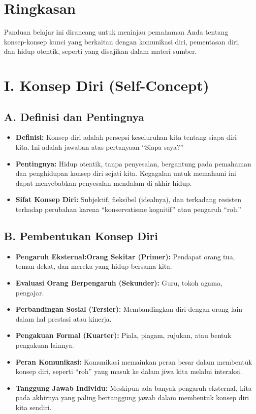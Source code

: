 \documentclass[
  letterpaper,
  DIV=11,
  numbers=noendperiod]{scrreprt}
\providecommand{\tightlist}{%
  \setlength{\itemsep}{0pt}\setlength{\parskip}{0pt}}
\begin{document}
\section{\texorpdfstring{\textbf{Ringkasan}}{Ringkasan}}\label{ringkasan}

Panduan belajar ini dirancang untuk meninjau pemahaman Anda tentang
konsep-konsep kunci yang berkaitan dengan komunikasi diri, pementasan
diri, dan hidup otentik, seperti yang disajikan dalam materi sumber.

\section{I. Konsep Diri
(Self-Concept)}\label{i.-konsep-diri-self-concept}

\subsection{A. Definisi dan
Pentingnya}\label{a.-definisi-dan-pentingnya}

\begin{itemize}
\tightlist
\item
  \textbf{Definisi:} Konsep diri adalah persepsi keseluruhan kita
  tentang siapa diri kita. Ini adalah jawaban atas pertanyaan ``Siapa
  saya?''
\item
  \textbf{Pentingnya:} Hidup otentik, tanpa penyesalan, bergantung pada
  pemahaman dan penghidupan konsep diri sejati kita. Kegagalan untuk
  memahami ini dapat menyebabkan penyesalan mendalam di akhir hidup.
\item
  \textbf{Sifat Konsep Diri:} Subjektif, fleksibel (idealnya), dan
  terkadang resisten terhadap perubahan karena ``konservatisme
  kognitif'' atau pengaruh ``roh.''
\end{itemize}

\subsection{B. Pembentukan Konsep
Diri}\label{b.-pembentukan-konsep-diri}

\begin{itemize}
\tightlist
\item
  \textbf{Pengaruh Eksternal:Orang Sekitar (Primer):} Pendapat orang
  tua, teman dekat, dan mereka yang hidup bersama kita.
\item
  \textbf{Evaluasi Orang Berpengaruh (Sekunder):} Guru, tokoh agama,
  pengajar.
\item
  \textbf{Perbandingan Sosial (Tersier):} Membandingkan diri dengan
  orang lain dalam hal prestasi atau kinerja.
\item
  \textbf{Pengakuan Formal (Kuarter):} Piala, piagam, rujukan, atau
  bentuk pengakuan lainnya.
\item
  \textbf{Peran Komunikasi:} Komunikasi memainkan peran besar dalam
  membentuk konsep diri, seperti ``roh'' yang masuk ke dalam jiwa kita
  melalui interaksi.
\item
  \textbf{Tanggung Jawab Individu:} Meskipun ada banyak pengaruh
  eksternal, kita pada akhirnya yang paling bertanggung jawab dalam
  membentuk konsep diri kita sendiri.
\end{itemize}
\end{document}
